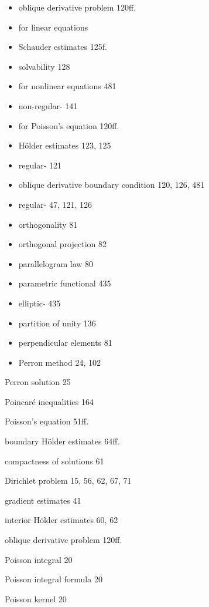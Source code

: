 \begin{itemize}
\item[] oblique derivative problem \hfill 120ff.
\item[] \quad for linear equations
\item[] \qquad Schauder estimates \hfill 125f.
\item[] \qquad solvability \hfill 128
\item[] \quad for nonlinear equations \hfill 481
\item[] \quad non-regular- \hfill 141
\item[] \quad for Poisson's equation \hfill 120ff.
\item[] \qquad Hölder estimates \hfill 123, 125
\item[] \qquad regular- \hfill 121
\item[] oblique derivative boundary condition \hfill 120, 126, 481
\item[] \quad regular- \hfill 47, 121, 126
\item[] orthogonality \hfill 81
\item[] orthogonal projection \hfill 82

\item[] parallelogram law \hfill 80
\item[] parametric functional \hfill 435
\item[] \quad elliptic- \hfill 435
\item[] partition of unity \hfill 136
\item[] perpendicular elements \hfill 81
\item[] Perron method \hfill 24, 102
\end{itemize}


Perron solution 25

Poincar\'e inequalities 164

Poisson's equation 51ff.

\quad boundary H\"older estimates 64ff.

\quad compactness of solutions 61

\quad Dirichlet problem 15, 56, 62, 67, 71

\quad gradient estimates 41

\quad interior H\"older estimates 60, 62

\quad oblique derivative problem 120ff.

Poisson integral 20

Poisson integral formula 20

Poisson kernel 20

